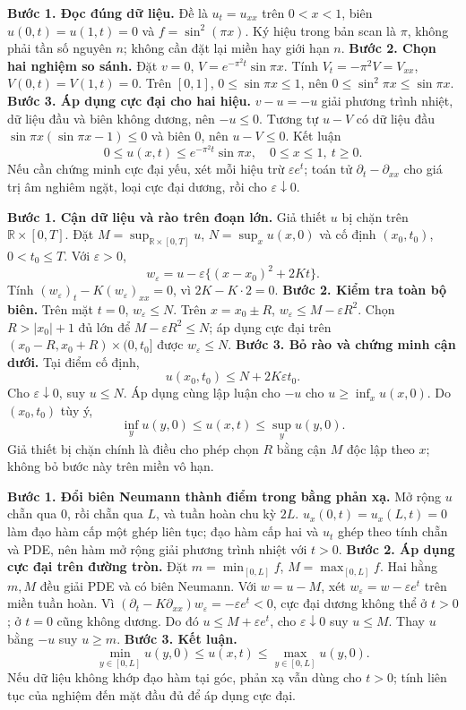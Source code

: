 \textbf{Bước 1. Đọc đúng dữ liệu.} Đề là $u_t=u_{xx}$ trên $0<x<1$, biên $u(0,t)=u(1,t)=0$ và $f=\sin^2(\pi x)$. Ký hiệu trong bản scan là $\pi$, không phải tần số nguyên $n$; không cần đặt lại miền hay giới hạn $n$.
\textbf{Bước 2. Chọn hai nghiệm so sánh.} Đặt $v=0$, $V=e^{-\pi^2t}\sin\pi x$. Tính $V_t=-\pi^2V=V_{xx}$, $V(0,t)=V(1,t)=0$. Trên $[0,1]$, $0\le\sin\pi x\le1$, nên $0\le\sin^2\pi x\le\sin\pi x$.
\textbf{Bước 3. Áp dụng cực đại cho hai hiệu.} $v-u=-u$ giải phương trình nhiệt, dữ liệu đầu và biên không dương, nên $-u\le0$. Tương tự $u-V$ có dữ liệu đầu $\sin\pi x(\sin\pi x-1)\le0$ và biên $0$, nên $u-V\le0$. Kết luận
\[0\le u(x,t)\le e^{-\pi^2t}\sin\pi x,\quad 0\le x\le1,\ t\ge0.\]
Nếu cần chứng minh cực đại yếu, xét mỗi hiệu trừ $\varepsilon e^t$; toán tử $\partial_t-\partial_{xx}$ cho giá trị âm nghiêm ngặt, loại cực đại dương, rồi cho $\varepsilon\downarrow0$.

\textbf{Bước 1. Cận dữ liệu và rào trên đoạn lớn.} Giả thiết $u$ bị chặn trên $\mathbb R\times[0,T]$. Đặt $M=\sup_{\mathbb R\times[0,T]}u$, $N=\sup_xu(x,0)$ và cố định $(x_0,t_0)$, $0<t_0\le T$. Với $\varepsilon>0$,
\[w_\varepsilon=u-\varepsilon\{(x-x_0)^2+2Kt\}.\]
Tính $(w_\varepsilon)_t-K(w_\varepsilon)_{xx}=0$, vì $2K-K\cdot2=0$.
\textbf{Bước 2. Kiểm tra toàn bộ biên.} Trên mặt $t=0$, $w_\varepsilon\le N$. Trên $x=x_0\pm R$, $w_\varepsilon\le M-\varepsilon R^2$. Chọn $R>|x_0|+1$ đủ lớn để $M-\varepsilon R^2\le N$; áp dụng cực đại trên $(x_0-R,x_0+R)\times(0,t_0]$ được $w_\varepsilon\le N$.
\textbf{Bước 3. Bỏ rào và chứng minh cận dưới.} Tại điểm cố định,
\[u(x_0,t_0)\le N+2K\varepsilon t_0.\]
Cho $\varepsilon\downarrow0$, suy $u\le N$. Áp dụng cùng lập luận cho $-u$ cho $u\ge\inf_xu(x,0)$. Do $(x_0,t_0)$ tùy ý,
\[\inf_yu(y,0)\le u(x,t)\le\sup_yu(y,0).\]
Giả thiết bị chặn chính là điều cho phép chọn $R$ bằng cận $M$ độc lập theo $x$; không bỏ bước này trên miền vô hạn.

\textbf{Bước 1. Đổi biên Neumann thành điểm trong bằng phản xạ.} Mở rộng $u$ chẵn qua $0$, rồi chẵn qua $L$, và tuần hoàn chu kỳ $2L$. $u_x(0,t)=u_x(L,t)=0$ làm đạo hàm cấp một ghép liên tục; đạo hàm cấp hai và $u_t$ ghép theo tính chẵn và PDE, nên hàm mở rộng giải phương trình nhiệt với $t>0$.
\textbf{Bước 2. Áp dụng cực đại trên đường tròn.} Đặt $m=\min_{[0,L]}f$, $M=\max_{[0,L]}f$. Hai hằng $m,M$ đều giải PDE và có biên Neumann. Với $w=u-M$, xét $w_\varepsilon=w-\varepsilon e^t$ trên miền tuần hoàn. Vì $(\partial_t-K\partial_{xx})w_\varepsilon=-\varepsilon e^t<0$, cực đại dương không thể ở $t>0$; ở $t=0$ cũng không dương. Do đó $u\le M+\varepsilon e^t$, cho $\varepsilon\downarrow0$ suy $u\le M$. Thay $u$ bằng $-u$ suy $u\ge m$.
\textbf{Bước 3. Kết luận.}
\[\min_{y\in[0,L]}u(y,0)\le u(x,t)\le\max_{y\in[0,L]}u(y,0).\]
Nếu dữ liệu không khớp đạo hàm tại góc, phản xạ vẫn dùng cho $t>0$; tính liên tục của nghiệm đến mặt đầu đủ để áp dụng cực đại.

